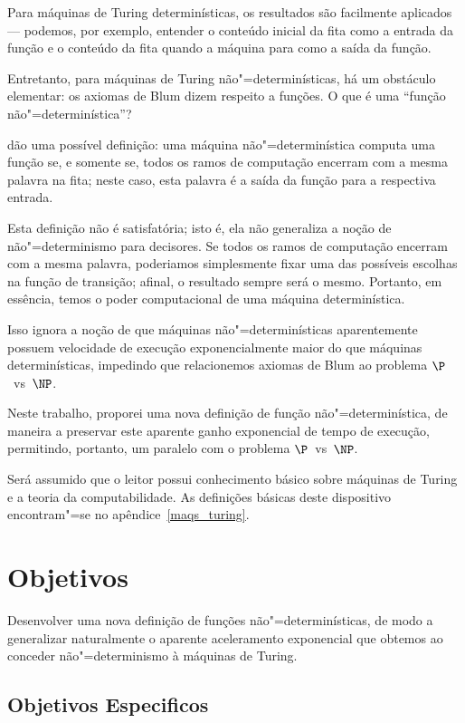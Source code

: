Para máquinas de Turing determinísticas,
os resultados são facilmente aplicados
--- podemos, por exemplo,
entender o conteúdo inicial da fita como a entrada da função
e o conteúdo da fita quando a máquina para como a saída da função.

Entretanto, para máquinas de Turing não"=determinísticas,
há um obstáculo elementar:
os axiomas de Blum dizem respeito a funções.
O que é uma ``função não"=determinística''?

 dão uma possível definição:
uma máquina não"=determinística computa uma função se,
e somente se,
todos os ramos de computação encerram com a mesma palavra na fita;
neste caso,
esta palavra é a saída da função para a respectiva entrada.

Esta definição não é satisfatória;
isto é, ela não generaliza a noção de não"=determinismo para decisores.
Se todos os ramos de computação encerram com a mesma palavra,
poderiamos simplesmente fixar uma das possíveis escolhas na função de transição;
afinal, o resultado sempre será o mesmo.
Portanto, em essência,
temos o poder computacional de uma máquina determinística.

Isso ignora a noção de que máquinas não"=determinísticas
aparentemente possuem velocidade de execução exponencialmente maior
do que máquinas determinísticas,
impedindo que relacionemos axiomas de Blum
ao problema $\P$~vs~$\NP$.

Neste trabalho,
proporei uma nova definição de função não"=determinística,
de maneira a preservar este aparente ganho exponencial de tempo de execução,
permitindo, portanto,
um paralelo com o problema $\P$~vs~$\NP$.

Será assumido que o leitor possui conhecimento básico
sobre máquinas de Turing e a teoria da computabilidade.
As definições básicas deste dispositivo
encontram"=se no apêndice~\ref{maqs_turing}.

\section{Objetivos}

Desenvolver uma nova definição de funções não"=determinísticas,
de modo a generalizar naturalmente o aparente aceleramento exponencial
que obtemos ao conceder não"=determinismo à máquinas de Turing.

\subsection{Objetivos Especificos}

